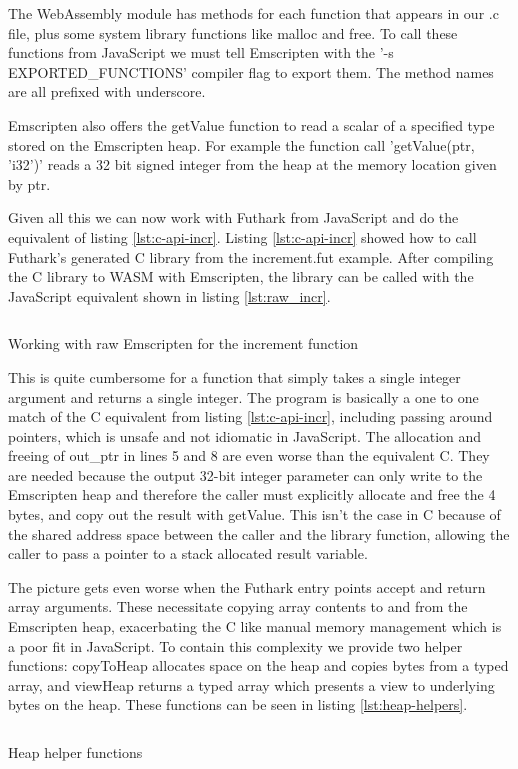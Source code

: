 \documentclass[11pt]{book}
\begin{document}
The WebAssembly module has methods for each function that appears in our .c file, plus some system library functions like malloc and free. To call these functions from JavaScript we must tell Emscripten with the '-s EXPORTED\_FUNCTIONS' compiler flag to export them. The method names are all prefixed with underscore.


Emscripten also offers the getValue function to read a scalar of a specified type stored on the Emscripten heap. For example the function call 'getValue(ptr, 'i32')' reads a 32 bit signed integer from the heap at the memory location given by ptr.






Given all this we can now work with Futhark from JavaScript and do the equivalent of listing \ref{lst:c-api-incr}. Listing \ref{lst:c-api-incr} showed how to call Futhark's generated C library from the increment.fut example. After compiling the C library to WASM with Emscripten, the library can be called with the JavaScript equivalent shown in listing \ref{lst:raw_incr}.

\begin{listing}[H] 
        \inputminted[fontsize=\small,baselinestretch=0.5,linenos]{JavaScript}{code/compiler/api_examples/raw_incr.js}
        \caption{Working with raw Emscripten for the increment function}
        \label{lst:raw_incr}    
\end{listing} 

This is quite cumbersome for a function that simply takes a single integer argument and returns a single integer.
The program is basically a one to one match of the C equivalent from listing \ref{lst:c-api-incr}, including passing around pointers, which is unsafe and not idiomatic in JavaScript.
The allocation and freeing of out\_ptr in lines 5 and 8 are even worse than the equivalent C. They are needed because the output 32-bit integer parameter can only write to the Emscripten heap and therefore the caller must explicitly allocate and free the 4 bytes, and copy out the result with getValue. This isn't the case in C because of the shared address space between the caller and the library function, allowing the caller to pass a pointer to a stack allocated result variable.

The picture gets even worse when the Futhark entry points accept and return array arguments.
These necessitate copying array contents to and from the Emscripten heap, exacerbating the C like manual memory management which is a poor fit in JavaScript. 
To contain this complexity we provide two helper functions: copyToHeap allocates space on the heap and copies bytes from a typed array, and viewHeap returns a typed array which presents a view to underlying bytes on the heap. These functions can be seen in listing \ref{lst:heap-helpers}.
\begin{listing}[H] 
        \inputminted[fontsize=\small,baselinestretch=0.5,linenos]{JavaScript}{code/compiler/api_examples/heap-helpers.js}
        \caption{Heap helper functions}
        \label{lst:heap-helpers}    
\end{listing} 
\end{document}
